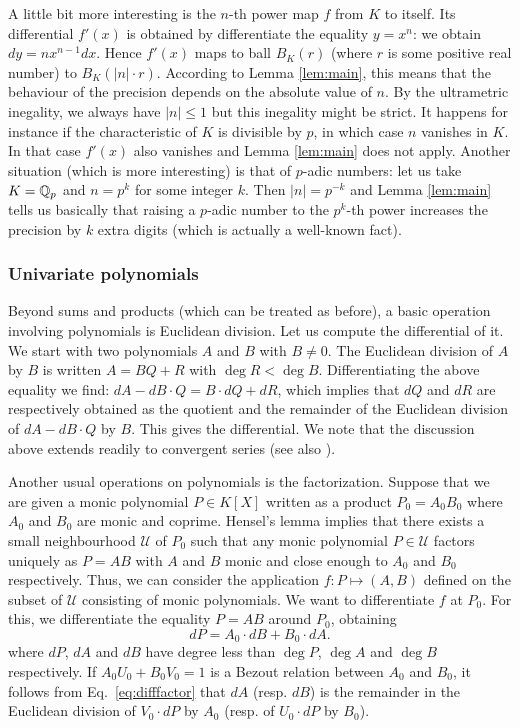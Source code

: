 \documentclass{amsart}
\begin{document}
A little bit more interesting is the $n$-th power map $f$ from $K$ to 
itself. Its differential $f'(x)$ is obtained by differentiate the 
equality $y = x^n$: we obtain $dy = n x^{n-1} dx$.
Hence $f'(x)$ maps to ball $B_K(r)$ (where $r$ is some positive real 
number) to $B_K(|n|{\cdot} r)$. According to Lemma \ref{lem:main}, this 
means that the behaviour of the precision depends on the absolute value 
of $n$. By the ultrametric inegality, we always have $|n| \leq 1$ but 
this inegality might be strict. It happens for instance if the 
characteristic of $K$ is divisible by $p$, in which case $n$ vanishes in 
$K$. In that case $f'(x)$ also vanishes and Lemma \ref{lem:main} does 
not apply. 
Another situation (which is more interesting) is that of $p$-adic 
numbers: let us take $K = \mathbb Q_p$ and $n = p^k$ for some integer $k$. Then
$|n| = p^{-k}$ and Lemma \ref{lem:main} tells us basically that raising
a $p$-adic number to the $p^k$-th power increases the precision by $k$
extra digits (which is actually a well-known fact).

\subsubsection*{Univariate polynomials}

Beyond sums and products (which can be treated as before), a basic 
operation involving polynomials is Euclidean division. Let us compute 
the differential of it. We start with two polynomials $A$ and $B$ with 
$B \neq 0$. The Euclidean division of $A$ by $B$ is written $A = BQ + R$ 
with $\deg R < \deg B$. Differentiating the above equality we find: 
$dA - dB \cdot Q = B \cdot dQ + dR$,
which implies that $dQ$ and $dR$ are respectively obtained as the 
quotient and the remainder of the Euclidean division of $dA - dB \cdot 
Q$ by $B$. This gives the differential. We note that the discussion 
above extends readily to convergent series (see also 
\cite{caruso-lubicz}).

Another usual operations on polynomials is the factorization. Suppose 
that we are given a monic polynomial $P \in K[X]$ written as a product 
$P_0 = A_0 B_0$ where $A_0$ and $B_0$ are monic and coprime. Hensel's 
lemma implies that there exists a small neighbourhood $\mathcal U$ of 
$P_0$ such that any monic polynomial $P \in \mathcal U$ factors uniquely 
as $P = A B$ with $A$ and $B$ monic and close enough to $A_0$ and $B_0$ 
respectively. Thus, we can consider the application $f : P \mapsto (A,B)$ 
defined on the subset of $\mathcal U$ consisting of monic polynomials.
We want to differentiate $f$ at $P_0$. For this, we differentiate the 
equality $P = A B$ around $P_0$, obtaining 
\begin{equation}
\label{eq:difffactor}
dP = A_0 \cdot dB + B_0 \cdot dA.
\end{equation}
where $dP$, $dA$ and $dB$ have degree less than $\deg P$, $\deg A$ and 
$\deg B$ respectively. If $A_0 U_0 + B_0 V_0 = 1$ is a Bezout relation
between $A_0$ and $B_0$, it follows from Eq.~\eqref{eq:difffactor} that
$dA$ (resp. $dB$) is the remainder in the Euclidean division of $V_0
{\cdot} dP$ by $A_0$ (resp. of $U_0 {\cdot} dP$ by $B_0$).
\end{document}
